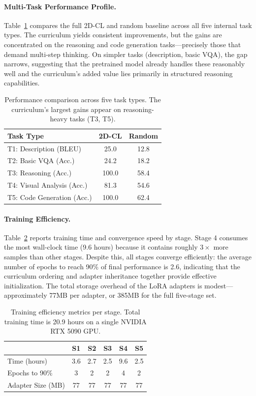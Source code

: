 ﻿\documentclass[journal]{IEEEtran}
\newcommand{\method}{2D-CL}
\begin{document}
\paragraph{Multi-Task Performance Profile.}
Table~\ref{tab:task_profile} compares the full \method{} and random baseline across all five internal task types. The curriculum yields consistent improvements, but the gains are concentrated on the reasoning and code generation tasks---precisely those that demand multi-step thinking. On simpler tasks (description, basic VQA), the gap narrows, suggesting that the pretrained model already handles these reasonably well and the curriculum's added value lies primarily in structured reasoning capabilities.

\begin{table}[!t]
\centering
\small
\begin{tabular}{lcc}
\toprule
\textbf{Task Type} & \textbf{\method{}} & \textbf{Random} \\
\midrule
T1: Description (BLEU) & 25.0 & 12.8 \\
T2: Basic VQA (Acc.) & 24.2 & 18.2 \\
T3: Reasoning (Acc.) & 100.0 & 58.4 \\
T4: Visual Analysis (Acc.) & 81.3 & 54.6 \\
T5: Code Generation (Acc.) & 100.0 & 62.4 \\
\bottomrule
\end{tabular}
\caption{Performance comparison across five task types. The curriculum's largest gains appear on reasoning-heavy tasks (T3, T5).}
\label{tab:task_profile}
\end{table}

\paragraph{Training Efficiency.}
Table~\ref{tab:efficiency} reports training time and convergence speed by stage. Stage 4 consumes the most wall-clock time (9.6 hours) because it contains roughly $3\times$ more samples than other stages. Despite this, all stages converge efficiently: the average number of epochs to reach 90\% of final performance is 2.6, indicating that the curriculum ordering and adapter inheritance together provide effective initialization. The total storage overhead of the LoRA adapters is modest---approximately 77MB per adapter, or 385MB for the full five-stage set.

\begin{table}[!t]
\centering
\small
\begin{tabular}{lccccc}
\toprule
& \textbf{S1} & \textbf{S2} & \textbf{S3} & \textbf{S4} & \textbf{S5} \\
\midrule
Time (hours) & 3.6 & 2.7 & 2.5 & 9.6 & 2.5 \\
Epochs to 90\% & 3 & 2 & 2 & 4 & 2 \\
Adapter Size (MB) & 77 & 77 & 77 & 77 & 77 \\
\bottomrule
\end{tabular}
\caption{Training efficiency metrics per stage. Total training time is 20.9 hours on a single NVIDIA RTX 5090 GPU.}
\label{tab:efficiency}
\end{table}



\end{document}
